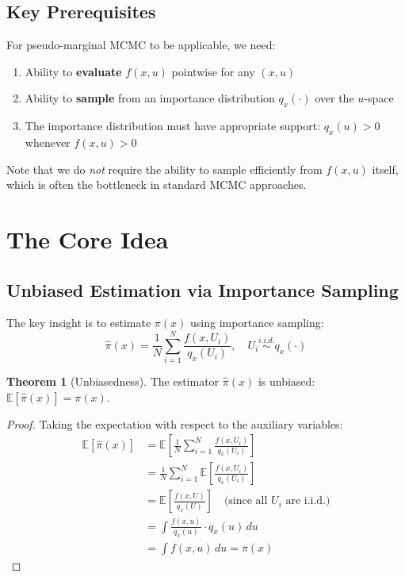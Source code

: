 \documentclass[11pt]{article}
\theoremstyle{definition}
\newtheorem{theorem}{Theorem}
\begin{document}
\subsection{Key Prerequisites}

For pseudo-marginal MCMC to be applicable, we need:
\begin{enumerate}
\item Ability to \textbf{evaluate} $f(x,u)$ pointwise for any $(x,u)$
\item Ability to \textbf{sample} from an importance distribution $q_x(\cdot)$ over the $u$-space
\item The importance distribution must have appropriate support: $q_x(u) > 0$ whenever $f(x,u) > 0$
\end{enumerate}

Note that we do \textit{not} require the ability to sample efficiently from $f(x,u)$ itself, which is often the bottleneck in standard MCMC approaches.

\section{The Core Idea}

\subsection{Unbiased Estimation via Importance Sampling}

The key insight is to estimate $\pi(x)$ using importance sampling:
\begin{equation}
\hat{\pi}(x) = \frac{1}{N} \sum_{i=1}^{N} \frac{f(x,U_i)}{q_x(U_i)}, \quad U_i \stackrel{i.i.d.}{\sim} q_x(\cdot)
\end{equation}

\begin{theorem}[Unbiasedness]
The estimator $\hat{\pi}(x)$ is unbiased: $\mathbb{E}[\hat{\pi}(x)] = \pi(x)$.
\end{theorem}

\begin{proof}
Taking the expectation with respect to the auxiliary variables:
\begin{align}
\mathbb{E}[\hat{\pi}(x)] &= \mathbb{E}\left[\frac{1}{N} \sum_{i=1}^{N} \frac{f(x,U_i)}{q_x(U_i)}\right]\\
&= \frac{1}{N} \sum_{i=1}^{N} \mathbb{E}\left[\frac{f(x,U_i)}{q_x(U_i)}\right]\\
&= \mathbb{E}\left[\frac{f(x,U)}{q_x(U)}\right] \quad \text{(since all $U_i$ are i.i.d.)}\\
&= \int \frac{f(x,u)}{q_x(u)} \cdot q_x(u) \, du\\
&= \int f(x,u) \, du = \pi(x)
\end{align}
\end{proof}
\end{document}
